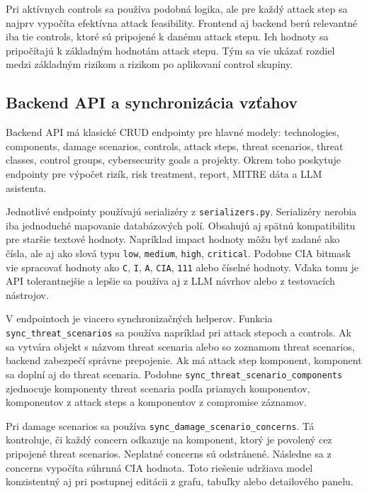 \documentclass[11pt]{article}
\begin{document}
Pri aktívnych controls sa používa podobná logika, ale pre každý attack step sa najprv vypočíta efektívna attack feasibility. Frontend aj backend berú relevantné iba tie controls, ktoré sú pripojené k danému attack stepu. Ich hodnoty sa pripočítajú k základným hodnotám attack stepu. Tým sa vie ukázať rozdiel medzi základným rizikom a rizikom po aplikovaní control skupiny.

\subsection{Backend API a synchronizácia vzťahov}

Backend API má klasické CRUD endpointy pre hlavné modely: technologies, components, damage scenarios, controls, attack steps, threat scenarios, threat classes, control groups, cybersecurity goals a projekty. Okrem toho poskytuje endpointy pre výpočet rizík, risk treatment, report, MITRE dáta a LLM asistenta.

Jednotlivé endpointy používajú serializéry z \texttt{serializers.py}. Serializéry nerobia iba jednoduché mapovanie databázových polí. Obsahujú aj spätnú kompatibilitu pre staršie textové hodnoty. Napríklad impact hodnoty môžu byť zadané ako čísla, ale aj ako slová typu \texttt{low}, \texttt{medium}, \texttt{high}, \texttt{critical}. Podobne CIA bitmask vie spracovať hodnoty ako \texttt{C}, \texttt{I}, \texttt{A}, \texttt{CIA}, \texttt{111} alebo číselné hodnoty. Vďaka tomu je API tolerantnejšie a lepšie sa používa aj z LLM návrhov alebo z testovacích nástrojov.

V endpointoch je viacero synchronizačných helperov. Funkcia \texttt{sync\_threat\_scenarios} sa používa napríklad pri attack stepoch a controls. Ak sa vytvára objekt s názvom threat scenaria alebo so zoznamom threat scenarios, backend zabezpečí správne prepojenie. Ak má attack step komponent, komponent sa doplní aj do threat scenaria. Podobne \texttt{sync\_threat\_scenario\_components} zjednocuje komponenty threat scenaria podľa priamych komponentov, komponentov z attack steps a komponentov z compromise záznamov.

Pri damage scenarios sa používa \texttt{sync\_damage\_scenario\_concerns}. Tá kontroluje, či každý concern odkazuje na komponent, ktorý je povolený cez pripojené threat scenarios. Neplatné concerns sú odstránené. Následne sa z concerns vypočíta súhrnná CIA hodnota. Toto riešenie udržiava model konzistentný aj pri postupnej editácii z grafu, tabuľky alebo detailového panelu.
\end{document}
